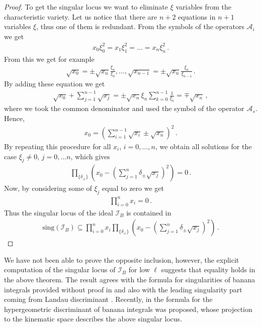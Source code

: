 \documentclass[11pt]{article}
\begin{document}
\begin{proof}
To get the singular locus we want to eliminate $\xi$ variables from the characteristic variety. Let us notice that there are $n+2$ equations in $n+1$ variables $\xi$, thus one of them is redundant.
From the symbols of the operators $\mathcal{A}_{i}$ we get
\begin{align}
x_{0} \xi_{0}^{2} = x_{1} \xi_{1}^{2} = \hdots = x_{n} \xi_{n}^{2} \,.   
\end{align}
From this we get for example
\begin{align}
\sqrt{x_{0}} = \pm \sqrt{x_{n}}\frac{\xi_{n}}{\xi_{0}}, \hdots , \sqrt{x_{n-1}} = \pm \sqrt{x_{n}}\frac{\xi_{n}}{\xi_{n-1}} \,.     
\end{align}
By adding these equation we get
\begin{align}
\sqrt{x_{0}} + \sum_{j=1}^{n-1}\sqrt{x_{j}} = \pm \sqrt{x_{n}} \xi_{n} \sum_{k=0}^{n-1} \frac{1}{\xi_{k}} = \mp \sqrt{x_{n}} \,,
\end{align}
where we took the common denominator and used the symbol of the operator $\mathcal{A}_{s}$. Hence,
\begin{align}
x_{0} =  \left( \sum_{i=1}^{n-1} \sqrt{x_{i}} \pm \sqrt{x_{n}}   \right)^{2} \,.    
\end{align}
By repeating this procedure for all $x_{i}$, $i=0,\hdots, n$, we obtain all solutions for the case $\xi_{j} \neq 0$, $j=0,\hdots n$, which gives
\begin{align}
\prod_{\lbrace \delta_{\pm} \rbrace} \left(x_{0}-\left(\sum_{j=1}^{n} \delta_{\pm} \sqrt{x_{j}} \right)^{2} \right) = 0 \,.    
\end{align}
Now, by considering some of $\xi_{j}$ equal to zero we get
\begin{align}
\prod_{i=0}^{n} x_{i} = 0 \,.   
\end{align}
Thus the singular locus of the ideal $\mathcal{I}_{B}$ is contained in
\begin{align}
\text{sing}(\mathcal{I}_{B}) \subseteq  \prod_{i=0}^{n} x_{i} \prod_{\lbrace \delta_{\pm} \rbrace} \left(x_{0}-\left(\sum_{j=1}^{n} \delta_{\pm} \sqrt{x_{j}} \right)^{2} \right) \,.     
\end{align}
\end{proof} 
We have not been able to prove the opposite inclusion, however, the explicit computation of the singular locus of $\mathcal{I}_{B}$ for low $\ell$ suggests that equality holds in the above theorem.
The result agrees with the formula for singularities of banana integrals provided without proof in \cite{Ponzano:1969tk} and also with the leading singularity part coming from Landau discriminant \cite{Mizera:2021icv}. Recently, in \cite{Matsubara-Heo:2025lrq} the formula for the hypergeometric discriminant of banana integrals was proposed, whose projection to the kinematic space describes the above singular locus.
\end{document}
